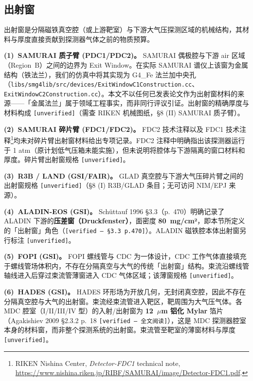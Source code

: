 \documentclass[a4paper, 11pt]{article}
\begin{document}
\subsection{出射窗}
\label{sec:exitwindow}

出射窗是分隔磁铁真空腔（或上游靶室）与下游大气压探测区域的机械结构，其材料与厚度直接贡献到探测器气体之前的物质预算。

\textbf{(1)~SAMURAI 质子臂 (PDC1/PDC2)。}
SAMURAI 偶极腔与下游 air 区域（Region~B）之间的边界为 Exit Window。在实际 SAMURAI 谱仪上该窗为金属结构（铁法兰），我们的仿真中将其实现为 G4\_Fe 法兰加中央孔（\texttt{libs/smg4lib/src/devices/ExitWindowC1Construction.cc}、\texttt{ExitWindowC2Construction.cc}）。本文不以任何已发表论文作为出射窗材料的来源——「金属法兰」属于领域工程事实，而非同行评议引证。出射窗的精确厚度与材料构成 \texttt{[unverified]}（需查 RIKEN 机械图纸，§8 (II) SAMURAI 质子臂）。

\textbf{(2)~SAMURAI 碎片臂 (FDC1/FDC2)。}
FDC2 技术注释以及 FDC1 技术注释\footnote{\label{fn:fdc1note}RIKEN Nishina Center, \emph{Detector-FDC1} technical note, \url{https://www.nishina.riken.jp/RIBF/SAMURAI/image/Detector-FDC1.pdf}.}均未对碎片臂出射窗材料给出专项记录。FDC2 注释中明确指出该探测器运行于 1 atm（原计划低气压箱未能实施），但未说明将腔体与下游隔离的窗口材料和厚度。碎片臂出射窗规格 \texttt{[unverified]}。

\textbf{(3)~R3B / LAND (GSI/FAIR)。}
GLAD 真空腔与下游大气压碎片臂之间的出射窗规格 \texttt{[unverified]}（§8 (I) R3B/GLAD 条目；无可访问 NIM/EPJ 来源）。

\textbf{(4)~ALADIN-EOS (GSI)。}
Schüttauf 1996 §3.3（p.~470）明确记录了 ALADIN 下游的\textbf{压差窗（Druckfenster）}，面密度 \textbf{80~mg/cm²}，即本节所定义的「出射窗」角色（\texttt{[verified --- §3.3 p.470]}）。ALADIN 磁铁腔本体出射窗另行标注 \texttt{[unverified]}。

\textbf{(5)~FOPI (GSI)。}
FOPI 螺线管与 CDC 为一体设计，CDC 工作气体直接填充于螺线管场体积内，不存在分隔真空与大气的传统「出射窗」结构。束流沿螺线管轴线进入后穿过束流管薄窗进入 CDC 气体区域；该薄窗规格 \texttt{[unverified]}。

\textbf{(6)~HADES (GSI)。}
HADES 环形场为开放几何，无封闭真空腔，因此不存在分隔真空腔与大气的出射窗。束流经束流管进入靶区，靶周围为大气压气体。各 MDC 腔室（I/II/III/IV 型）的入射/出射窗为 \textbf{12~$\mu$m 铝化 Mylar} 箔片（Agakishiev 2009 §2.3.2 p.~18 \texttt{[verified --- 全文阅读]}），这是 MDC 探测器腔室本身的材料窗，而非整个探测系统的出射窗。束流管至靶室的薄窗材料与厚度 \texttt{[unverified]}。
\end{document}

